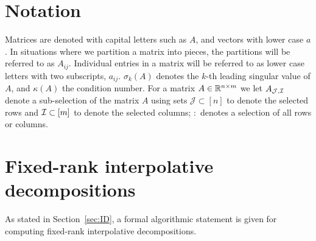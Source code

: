 \appendix


\section{Notation}

Matrices are denoted with capital letters such as $A$, and vectors with lower case $a$.  In situations where we partition a matrix into pieces, the partitions will be referred to as $A_{ij}$.  Individual entries in a matrix will be referred to as lower case letters with two subscripts, $a_{ij}$.  
$\sigma_k(A)$ denotes the $k$-th leading singular value of $A$, and $\kappa(A)$ the condition number.
For a matrix $A\in\mathbb{R}^{n\times m}$ we let $A_{\mathcal{J},\mathcal{I}}$ denote a sub-selection of the matrix $A$ using sets $\mathcal{J}\subset [n]$ to denote the selected rows and $\mathcal{I}\subset [m]$ to denote the selected columns; $:$ denotes a selection of all rows or columns.

\section{Fixed-rank interpolative decompositions}

As stated in Section~\ref{sec:ID}, a formal algorithmic statement is given for computing fixed-rank interpolative decompositions.
    
